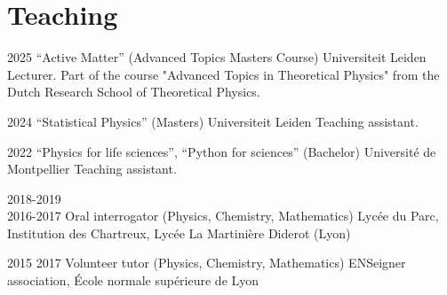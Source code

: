 \documentclass[a4paper]{cvtemplate_en} %
\begin{document}

\section{Teaching}

\begin{cvbody}

\cvitem
	{2025}
	{}
	{``Active Matter'' (Advanced Topics Masters Course)}
	{Universiteit Leiden \vspace{-5pt}}
	{}{}{}
	{}
	{Lecturer. Part of the course "Advanced Topics in Theoretical Physics" from the Dutch Research School of Theoretical Physics. \vspace{5pt}}

\cvitem
	{2024}
	{}
	{``Statistical Physics'' (Masters)}
	{Universiteit Leiden }
	{}{}{}
	{}
	{Teaching assistant.\vspace{5pt}}

\end{cvbody}

\newpage

\begin{cvbody}

\cvitem
	{2022}
	{}
	{``Physics for life sciences'', ``Python for sciences'' (Bachelor)}
	{Université de Montpellier }
	{}{}{}
    {}
	{Teaching assistant.\vspace{5pt}}

\cvitem
	{2018-2019\\ \mbox{}\hfill 2016-2017}
	{}
	{Oral interrogator (Physics, Chemistry, Mathematics)}
	{Lyc\'ee du Parc, Institution des Chartreux, Lyc\'ee La Martinière Diderot (Lyon) }
	{}{}{}
	{}
	{\vspace{5pt}
	}


\cvitem
	{2015}
	{2017}
	{Volunteer tutor (Physics, Chemistry, Mathematics)}
	{ENSeigner association, \'Ecole normale sup\'erieure de Lyon }
	{}{}{}
	{}
	{\vspace{5pt}
	}

\end{cvbody}
\end{document}
